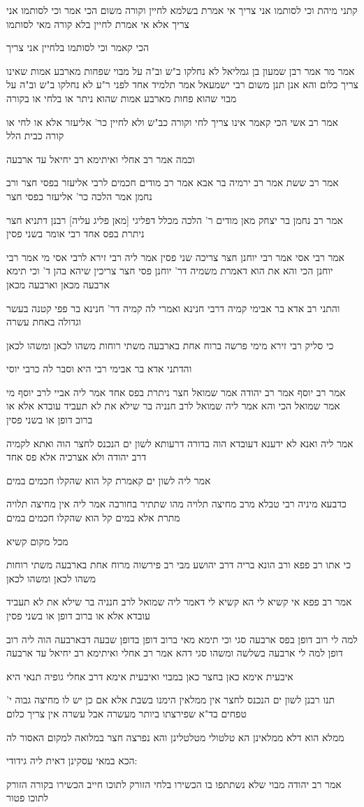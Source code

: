 \documentclass[12pt, openany]{book}
\newcommand{\sethebfont}{
\fontsize{10.5pt}{21.0pt} \selectfont
}
\newcommand{\textblock}[1]{
{\sethebfont #1\\}	
}
\begin{document}
\textblock{קתני מיהת וכי לסותמו אני צריך אי אמרת בשלמא לחיין וקורה משום הכי אמר וכי לסותמו אני צריך אלא אי אמרת לחיין בלא קורה מאי לסותמו}
\textblock{הכי קאמר וכי לסותמו בלחיין אני צריך}
\textblock{אמר מר אמר רבן שמעון בן גמליאל לא נחלקו ב"ש וב"ה על מבוי שפחות מארבע אמות שאינו צריך כלום והא אנן תנן משום רבי ישמעאל אמר תלמיד אחד לפני ר"ע לא נחלקו ב"ש וב"ה על מבוי שהוא פחות מארבע אמות שהוא ניתר או בלחי או בקורה}
\textblock{אמר רב אשי הכי קאמר אינו צריך לחי וקורה כב"ש ולא לחיין כר' אליעזר אלא או לחי או קורה כבית הלל}
\textblock{וכמה אמר רב אחלי ואיתימא רב יחיאל עד ארבעה}
\textblock{אמר רב ששת אמר רב ירמיה בר אבא אמר רב מודים חכמים לרבי אליעזר בפסי חצר ורב נחמן אמר הלכה כר' אליעזר בפסי חצר}
\textblock{אמר רב נחמן בר יצחק מאן מודים ר' הלכה מכלל דפליגי [מאן פליג עליה] רבנן דתניא חצר ניתרת בפס אחד רבי אומר בשני פסין}
\textblock{אמר רבי אסי אמר רבי יוחנן חצר צריכה שני פסין אמר ליה רבי זירא לרבי אסי מי אמר רבי יוחנן הכי והא את הוא דאמרת משמיה דר' יוחנן פסי חצר צריכין שיהא בהן ד' וכי תימא ארבעה מכאן וארבעה מכאן}
\textblock{והתני רב אדא בר אבימי קמיה דרבי חנינא ואמרי לה קמיה דר' חנינא בר פפי קטנה בעשר וגדולה באחת עשרה}
\textblock{כי סליק רבי זירא מימי פרשה ברוח אחת בארבעה משתי רוחות משהו לכאן ומשהו לכאן}
\textblock{והדתני אדא בר אבימי רבי היא וסבר לה כרבי יוסי}
\textblock{אמר רב יוסף אמר רב יהודה אמר שמואל חצר ניתרת בפס אחד אמר ליה אביי לרב יוסף מי אמר שמואל הכי והא אמר ליה שמואל לרב חנניה בר שילא את לא תעביד עובדא אלא או ברוב דופן או בשני פסין}
\textblock{אמר ליה ואנא לא ידענא דעובדא הוה בדורה דרעותא לשון ים הנכנס לחצר הוה ואתא לקמיה דרב יהודה ולא אצרכיה אלא פס אחד}
\textblock{אמר ליה לשון ים קאמרת קל הוא שהקלו חכמים במים}
\textblock{כדבעא מיניה רבי טבלא מרב מחיצה תלויה מהו שתתיר בחורבה אמר ליה אין מחיצה תלויה מתרת אלא במים קל הוא שהקלו חכמים במים}
\textblock{מכל מקום קשיא}
\textblock{כי אתו רב פפא ורב הונא בריה דרב יהושע מבי רב פירשוה מרוח אחת בארבעה משתי רוחות משהו לכאן ומשהו לכאן}
\textblock{אמר רב פפא אי קשיא לי הא קשיא לי דאמר ליה שמואל לרב חנניה בר שילא את לא תעביד עובדא אלא או ברוב דופן או בשני פסין}
\textblock{למה לי רוב דופן בפס ארבעה סגי וכי תימא מאי ברוב דופן בדופן שבעה דבארבעה הוה ליה רוב דופן למה לי ארבעה בשלשה ומשהו סגי דהא אמר רב אחלי ואיתימא רב יחיאל עד ארבעה}
\textblock{איבעית אימא כאן בחצר כאן במבוי ואיבעית אימא דרב אחלי גופיה תנאי היא}
\textblock{תנו רבנן לשון ים הנכנס לחצר אין ממלאין הימנו בשבת אלא אם כן יש לו מחיצה גבוה י' טפחים בד"א שפירצתו ביותר מעשרה אבל עשרה אין צריך כלום}
\textblock{ממלא הוא דלא ממלאינן הא טלטולי מטלטלינן והא נפרצה חצר במלואה למקום האסור לה}
\textblock{הכא במאי עסקינן דאית ליה גידודי:}
\textblock{אמר רב יהודה מבוי שלא נשתתפו בו הכשירו בלחי הזורק לתוכו חייב הכשירו בקורה הזורק לתוכו פטור}
\end{document}
